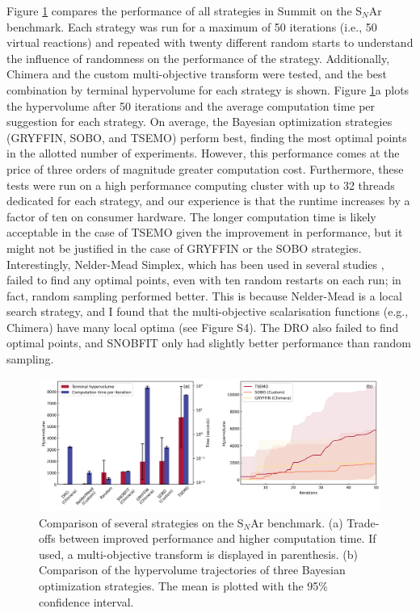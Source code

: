 Figure \ref{fig:hv_time_tradeoff} compares the performance of all strategies in Summit on the S$_N$Ar benchmark. Each strategy was run for a maximum of 50 iterations (i.e., 50 virtual reactions) and repeated with twenty different random starts to understand the influence of randomness on the performance of the strategy. Additionally, Chimera and the custom multi-objective transform were tested, and the best combination by terminal hypervolume for each strategy is shown. Figure \ref{fig:hv_time_tradeoff}a plots the hypervolume after 50 iterations and the average computation time per suggestion for each strategy. On average, the Bayesian optimization strategies (GRYFFIN, SOBO, and TSEMO) perform best, finding the most optimal points in the allotted number of experiments. However, this performance comes at the price of three orders of magnitude greater computation cost. Furthermore, these tests were run on a high performance computing cluster with up to 32 threads dedicated for each strategy, and our experience is that the runtime increases by a factor of ten on consumer hardware.  The longer computation time is likely acceptable in the case of TSEMO given the improvement in performance, but it might not be justified in the case of GRYFFIN or the SOBO strategies.  Interestingly, Nelder-Mead Simplex, which has been used in several studies \cite{McMullen2010b, Parrott2011, Sans2015, CortesBorda2016, Fitzpatrick2016, McMullen2010a, Poscharny2018}, failed to find any optimal points, even with ten random restarts on each run; in fact, random sampling performed better. This is because Nelder-Mead is a local search strategy, and I found that the multi-objective scalarisation functions (e.g., Chimera) have many local optima (see Figure S4). The DRO also failed to find optimal points, and SNOBFIT only had slightly better performance than random sampling.

\begin{figure}
    \centering
    \includegraphics[width=1.2\textwidth]{gfx/Chapter02/snar_hv_time_tradeoff.png}
    \caption{Comparison of several strategies on the S$_N$Ar benchmark. (a) Trade-offs between improved performance and higher computation time. If used, a multi-objective transform is displayed in parenthesis. (b) Comparison of the hypervolume trajectories of three Bayesian optimization strategies. The mean is plotted with the 95\% confidence interval.}
    \label{fig:hv_time_tradeoff}
\end{figure}

